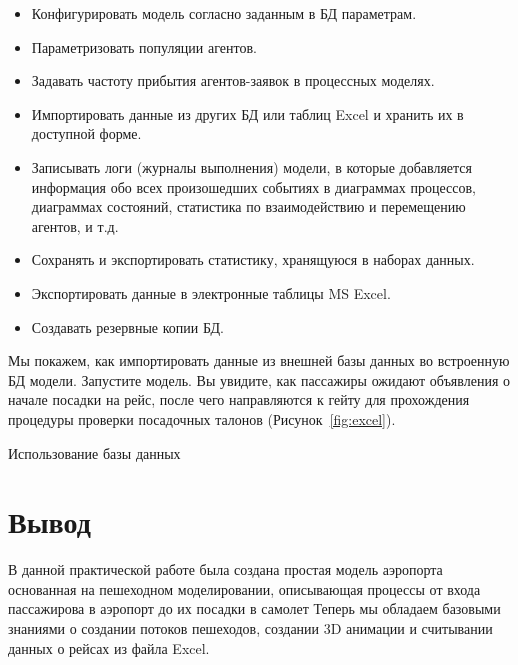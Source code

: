 \begin{itemize}
	\item Конфигурировать модель согласно заданным в БД параметрам.
	\item Параметризовать популяции агентов.
	\item Задавать частоту прибытия агентов-заявок в процессных моделях.
	\item Импортировать данные из других БД или таблиц Excel и хранить их в
		доступной форме.
	\item Записывать логи (журналы выполнения) модели, в которые добавляется
		информация обо всех произошедших событиях в диаграммах
		процессов, диаграммах состояний, статистика по взаимодействию и
		перемещению агентов, и т.д.
	\item Сохранять и экспортировать статистику, хранящуюся в наборах данных.
	\item Экспортировать данные в электронные таблицы MS Excel.
	\item Создавать резервные копии БД.
\end{itemize}

Мы покажем, как импортировать данные из внешней базы данных во
встроенную БД модели.
Запустите модель. Вы увидите, как пассажиры ожидают объявления о
начале посадки на рейс, после чего направляются к гейту для прохождения
процедуры проверки посадочных талонов (Рисунок~\ref{fig:excel}).

\begin{image}
	\caption{Использование базы данных}
	\label{fig:excel}
\end{image}


\clearpage

\section*{\LARGE Вывод}
В данной практической работе была создана простая модель аэропорта
основанная на пешеходном моделировании, описывающая процессы
от входа пассажирова в аэропорт до их посадки в самолет
Теперь мы обладаем базовыми знаниями о создании потоков
пешеходов, создании 3D анимации и считывании данных о рейсах из файла Excel.

